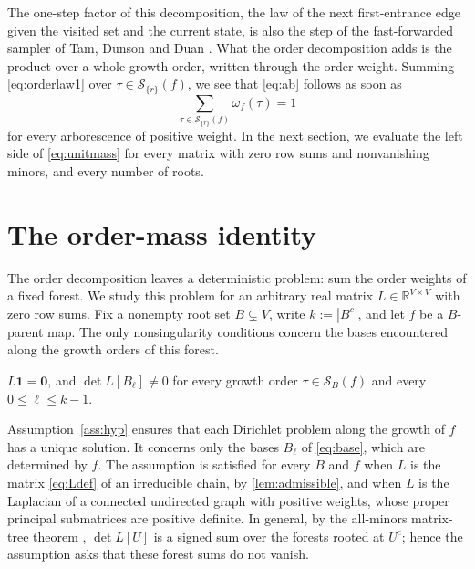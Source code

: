 \documentclass[onefignum,onetabnum,nohypdvips]{siamart250211}
\numberwithin{theorem}{section}
\numberwithin{equation}{section}
\newcommand{\Orders}{\mathcal{S}}
\newcommand{\R}{\mathbb{R}}
\newcommand{\one}{\mathbf{1}}
\newcommand{\zero}{\mathbf{0}}
\begin{document}
The one-step factor of this decomposition, the law of the next
first-entrance edge given the visited set and the current state, is
also the step of the fast-forwarded sampler of Tam, Dunson and Duan
\cite{TamDunsonDuan2025}. What the order decomposition adds is the
product over a whole growth order, written through the order weight. Summing \eqref{eq:orderlaw1} over $\tau\in\Orders_{\{r\}}(f)$, we see that
\eqref{eq:ab} follows as soon as
\begin{equation}\label{eq:unitmass}
\sum_{\tau\in\Orders_{\{r\}}(f)}\omega_f(\tau)=1
\end{equation}
for every arborescence of positive weight. In the next section,
we evaluate the left side of \eqref{eq:unitmass} for every matrix with
zero row sums and nonvanishing minors, and every number of roots.

\section{The order-mass identity}\label{sec:identity}

The order decomposition leaves a deterministic problem: sum the order
weights of a fixed forest. We study this problem for an arbitrary real
matrix $L\in\R^{V\times V}$ with zero row sums. Fix a nonempty root
set $B\subsetneq V$, write $k:=|B^c|$, and let $f$ be a $B$-parent map.
The only nonsingularity conditions concern the bases encountered
along the growth orders of this forest.

\begin{assumption}\label{ass:hyp}
$L\one=\zero$, and $\det L[B_\ell]\ne0$ for every growth order
$\tau\in\Orders_B(f)$ and every $0\le \ell\le k-1$.
\end{assumption}

\begin{remark}\label{rem:hyp}
Assumption~\ref{ass:hyp} ensures that each Dirichlet problem along the
growth of $f$ has a unique solution. It concerns only the bases
$B_\ell$ of \eqref{eq:base}, which are determined by $f$. The
assumption is satisfied for every $B$ and $f$
when $L$ is the matrix \eqref{eq:Ldef} of an irreducible chain, by
\cref{lem:admissible}, and when $L$ is the Laplacian of a connected undirected
graph with positive weights, whose proper principal submatrices are
positive definite. In general, by the all-minors matrix-tree theorem
\cite{Chaiken1982}, $\det L[U]$ is a signed sum over the forests rooted
at $U^c$; hence the assumption asks that these forest sums do not
vanish.
\end{remark}
\end{document}
